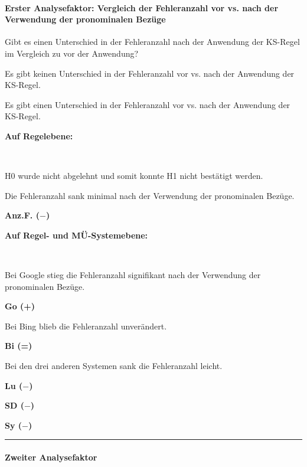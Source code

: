 
\paragraph*{Erster Analysefaktor: Vergleich der Fehleranzahl vor vs. nach der Verwendung der pronominalen Bezüge}
\begin{description}[font=\normalfont\bfseries]
\item [Fragestellung:] Gibt es einen Unterschied in der Fehleranzahl nach der Anwendung der KS-Regel im Vergleich zu vor der Anwendung?
\item [H0 --] Es gibt keinen Unterschied in der Fehleranzahl vor vs. nach der Anwendung der KS-Regel.
\item [H1 --] Es gibt einen Unterschied in der Fehleranzahl vor vs. nach der Anwendung der KS-Regel.
\item [Resultat]
\end{description}
\noindent
\parbox[t]{.8\textwidth}{\textbf{Auf Regelebene:}}\\
\noindent
\parbox[t]{.8\textwidth}{H0 wurde nicht abgelehnt und somit konnte H1 nicht bestätigt werden.

Die Fehleranzahl sank minimal nach der Verwendung der pronominalen Bezüge.}
\parbox[t]{.04\textwidth}{}
\parbox[t]{.15\textwidth}{\textbf{Anz.F. ($-$)}}

\noindent
\parbox[t]{.8\textwidth}{\textbf{Auf Regel- und MÜ-Systemebene:}}\\
\noindent
\parbox[t]{.8\textwidth}{Bei Google stieg die Fehleranzahl signifikant nach der Verwendung der pronominalen Bezüge.}
\parbox[t]{.04\textwidth}{}
\colorbox{smGreen}{\parbox[t]{.15\textwidth}{\textbf{Go (+)}\\}}

\medskip
\noindent
\parbox[t]{.8\textwidth}{Bei Bing blieb die Fehleranzahl unverändert.}
\parbox[t]{.04\textwidth}{}
\parbox[t]{.15\textwidth}{\textbf{Bi (=)}}

\medskip
\noindent
\parbox[t]{.8\textwidth}{Bei den drei anderen Systemen sank die Fehleranzahl leicht.}
\parbox[t]{.04\textwidth}{}
\parbox[t]{.15\textwidth}{{ \textbf{Lu ($-$)}}

{ \textbf{SD ($-$)}}

 \textbf{Sy ($-$)}}

 \hrule
 \newpage
 \paragraph*{Zweiter Analysefaktor}\hfill

